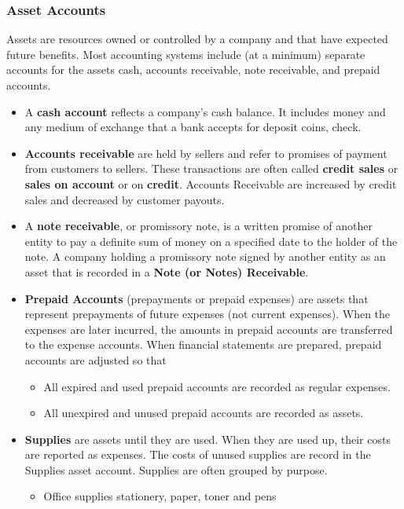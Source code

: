\documentclass[../main.tex]{subfiles}
\begin{document}
	\subsubsection{Asset Accounts} 
	
	Assets are resources owned or controlled by a company and 
	that have expected future benefits. Most accounting systems include (at a 
	minimum) separate accounts for the assets \eg cash, 
	accounts receivable, note receivable, and prepaid accounts.
	\begin{itemize}[noitemsep]
		\item A \textbf{cash account} reflects a company's cash balance. It 
		includes money and any medium of exchange that a bank accepts for 
		deposit \eg coins, check.
		\item \textbf{Accounts receivable} are held by sellers and refer to 
		promises of 
		payment from customers to sellers. These transactions are often called 
		\textbf{credit sales} or \textbf{sales on account} or on 
		\textbf{credit}. Accounts Receivable are increased by credit 
		sales and decreased by customer payouts. 
		\item A \textbf{note receivable}, or promissory note, is a written 
		promise of another entity to pay a definite sum of money on a specified 
		date to the holder of the note. A company holding a promissory note 
		signed by another entity as an asset that is recorded in a \textbf{Note 
		(or Notes) Receivable}.
		\item \textbf{Prepaid Accounts} (prepayments or prepaid expenses) are 
		assets that represent prepayments of future expenses (not current 
		expenses). When the expenses are later incurred, the amounts in prepaid 
		accounts are transferred to the expense accounts. When financial 
		statements are prepared, prepaid accounts are adjusted so that 
		\begin{itemize}[noitemsep]
			\item All expired and used prepaid accounts are recorded as regular 
			expenses.
			\item All unexpired and unused prepaid accounts are recorded as 
			assets. 
		\end{itemize}
		\item \textbf{Supplies} are assets until they are used. When they are 
		used up, 
		their costs are reported as expenses. The costs of unused supplies are 
		record in the Supplies asset account. Supplies are often 
		grouped by purpose. 
		\begin{itemize}[noitemsep]
			\item Office supplies \eg stationery, paper, toner and pens

\end{itemize}
\end{itemize}
\end{document}
